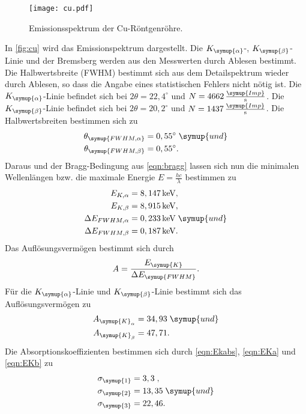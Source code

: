\begin{figure}
  \centering
  \texttt{[image: cu.pdf]}
  \caption{Emissionsspektrum der Cu-Röntgenröhre.}
  \label{fig:cu}
\end{figure}
In \autoref{fig:cu} wird das Emissionspektrum dargestellt. Die $K_{\symup{\alpha}}$-, $K_{\symup{\beta}}$-Linie und
der Bremsberg werden aus den Messwerten durch Ablesen bestimmt. Die Halbwertsbreite (FWHM) bestimmt sich aus dem
Detailspektrum wieder durch Ablesen, so dass die Angabe eines statistischen Fehlers nicht nötig ist.
Die $K_{\symup{\alpha}}$-Linie befindet sich bei $2\theta=22,4^{\circ}$ und 
$N = 4662\,\frac{\symup{Imp}}{\unit{\second}}$. Die $K_{\symup{\beta}}$-Linie befindet sich bei 
$2\theta=20,2^{\circ}$ und $N = 1437\,\frac{\symup{Imp}}{\unit{\second}}$. Die Halbwertsbreiten bestimmen sich zu
\begin{align*}
  \theta_{\symup{FWHM, \alpha}} &= 0,55^{\circ} \; \symup{und} \\
  \theta_{\symup{FWHM, \beta}} &= 0,55^{\circ}. 
\end{align*}
Daraus und der Bragg-Bedingung aus \autoref{eqn:bragg} lassen sich nun die minimalen Wellenlängen bzw.
die maximale Energie $E = \frac{hc}{\lambda}$ bestimmen zu
\begin{align*}
  E_{K,\alpha}           &= 8,147\,\unit{\kilo\eV},\\
  E_{K, \beta}           &= 8,915\,\unit{\kilo\eV},\\
  \Delta E_{FWHM,\alpha} &= 0,233\,\unit{\kilo\eV} \; \symup{und}\\
  \Delta E_{FWHM,\beta}  &= 0,187\,\unit{\kilo\eV}.
\end{align*}
Das Auflösungsvermögen bestimmt sich durch
\begin{align*}
  A = \frac{E_{\symup{K}}}{\Delta E_{\symup{FWHM}}}.
\end{align*}
Für die $K_{\symup{\alpha}}$-Linie und $K_{\symup{\beta}}$-Linie bestimmt sich das Auflösungsvermögen zu
\begin{align*}
  A_{\symup{K}_{\alpha}}  &=  34,93 \; \symup{und}\\
  A_{\symup{K}_{\beta}}   &= 47,71.
\end{align*}
Die Absorptionskoeffizienten bestimmen sich durch \autoref{eqn:Ekabs}, \autoref{eqn:EKa} und
\autoref{eqn:EKb} zu
\begin{align*}
  \sigma_{\symup{1}} &= 3,3\;,\\
  \sigma_{\symup{2}} &= 13,35\; \symup{und}\\
  \sigma_{\symup{3}} &= 22,46.
\end{align*}

